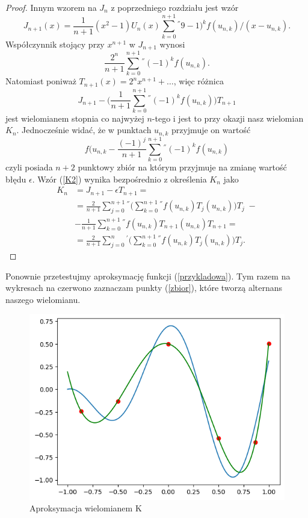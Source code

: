 \documentclass[11pt,wide]{mwart}
\begin{document}
\begin{proof} \cite{k1}
Innym wzorem na $J_n$ z poprzedniego rozdziału jest wzór
\begin{equation}
J_{n+1}(x) = \frac{1}{n+1}(x^2-1)U_n(x) \sum_{k=0}^{n+1} {}^{''} 9-1)^kf(u_{n,k})/(x-u_{n,k}).
\end{equation}
Współczynnik stojący przy $x^{n+1}$ w $J_{n+1}$ wynosi
\begin{equation}
\frac{2^n}{n+1} \sum_{k=0}^{n+1} {}^{''} (-1)^kf(u_{n,k}).
\end{equation}
Natomiast poniważ $T_{n+1}(x) = 2^nx^{n+1} + \dots$, więc różnica
\begin{equation}
J_{n+1} - \Big( \frac{1}{n+1} \sum_{k=0}^{n+1} {}^{''} (-1)^kf(u_{n,k}) \Big) T_{n+1}
\end{equation}
jest wielomianem stopnia co najwyżej $n$-tego i jest to przy okazji nasz wielomian $K_n$. Jednocześnie widać, że w punktach $u_{n,k}$ przyjmuje on wartość
\begin{equation}
f(u_{n,k} - \frac{(-1)^j}{n+1} \sum_{k=0}^{n+1} {}^{''} (-1)^kf(u_{n,k})
\end{equation}
czyli posiada $n+2$ punktowy zbiór na którym przyjmuje na zmianę wartość błędu $\epsilon$. Wzór (\ref{K2}) wynika bezpośrednio z określenia $K_n$ jako 
\begin{align*}
K_n &= J_{n+1} - \epsilon T_{n+1} = \\
&= \frac{2}{n+1} \sum_{j=0}^{n+1} {}^{''} \Big( \sum_{k=0}^{n+1} {}^{''} f(u_{n,k})T_j(u_{n,k}) \Big) T_j \;- \\
&- \frac{1}{n+1} \sum_{k=0}^{n+1} {}^{''} f(u_{n,k})T_{n+1}(u_{n,k})T_{n+1} = \\
&= \frac{2}{n+1} \sum_{j=0}^n {}^{'} \Big(\sum_{k=0}^{n+1} {}^{''} f(u_{n,k})T_j(u_{n,k})\Big)T_j.
\end{align*}
\end{proof}
Ponownie przetestujmy aproksymację funkcji (\ref{przykladowa}). Tym razem na wykresach na czerwono zaznaczam punkty (\ref{zbior}), które tworzą alternans naszego wielomianu. 
\begin{figure}[H]
	\begin{center}
	\includegraphics[scale=0.7]{przyklad_K}
	\end{center}
	\caption{Aproksymacja wielomianem K}
\end{figure}
\end{document}
